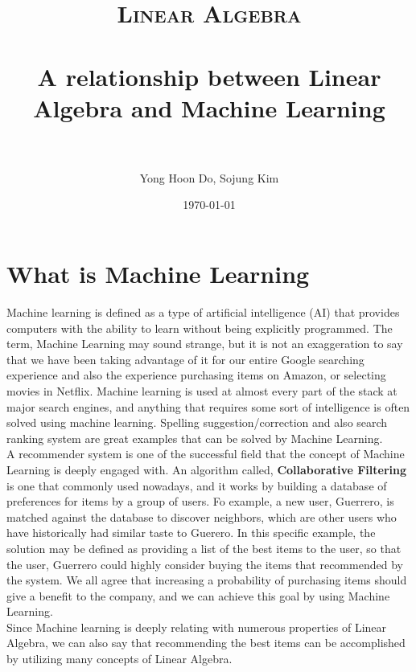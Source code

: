 \documentclass[paper=a4, fontsize=12pt]{scrartcl} %
\title{
\normalfont \normalsize
\textsc{Linear Algebra} \\ [25pt] %
\horrule{0.5pt} \\[0.4cm] %
\huge A relationship between Linear Algebra and Machine Learning \\
\horrule{2pt} \\[0.5cm] %
}
\author{Yong Hoon Do, Sojung Kim} %
\date{\normalsize\today} %
\numberwithin{equation}{section} %
\numberwithin{figure}{section} %
\numberwithin{table}{section} %
\begin{document}
\maketitle %

\section{What is Machine Learning}

Machine learning is defined as a type of artificial intelligence (AI) that
provides computers with the ability to learn without being explicitly
programmed. The term, Machine Learning may sound strange, but it is not an
exaggeration to say that we have been taking advantage of it for our entire
Google searching experience and also the experience purchasing items on Amazon,
or selecting movies in Netflix. Machine learning is used at almost every part of
the stack at major search engines, and anything that requires some sort of
intelligence is often solved using machine learning. Spelling
suggestion/correction and also search ranking system are great examples that can be solved by Machine Learning. \\

A recommender system is one of the successful field that the concept of Machine
Learning is deeply engaged with. An algorithm called,
\textbf{Collaborative Filtering} is one that commonly used nowadays, and it works by building a
database of preferences for items by a group of users. Fo  example, a new user,
Guerrero, is matched against the database to discover neighbors, which are other
users who have historically had similar taste to Guerero.
In this specific example, the solution may be defined as providing
a list of the best items to the user, so that the user, Guerrero could highly
consider buying the items that recommended by the system.
We all agree that increasing a probability of purchasing items should give a
benefit to the company, and we can achieve this goal by using Machine Learning. \\

Since Machine learning is deeply relating with numerous properties of Linear Algebra,
we can also say that recommending the best items can be accomplished by
utilizing many concepts of Linear Algebra. \\
\end{document}
